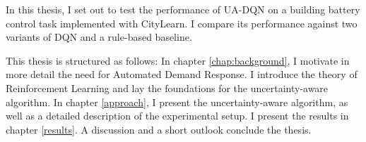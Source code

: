 In this thesis, I set out to test the performance of UA-DQN on a building battery control task implemented with CityLearn.
I compare its performance against two variants of DQN and a rule-based baseline.

This thesis is structured as follows: In chapter \ref{chap:background}, I motivate in more detail the need for Automated Demand Response. I introduce the theory of Reinforcement Learning and lay the foundations for the uncertainty-aware algorithm.
In chapter \ref{approach}, I present the uncertainty-aware algorithm, as well as a detailed description of the experimental setup.
I present the results in chapter \ref{results}.
A discussion and a short outlook conclude the thesis.
